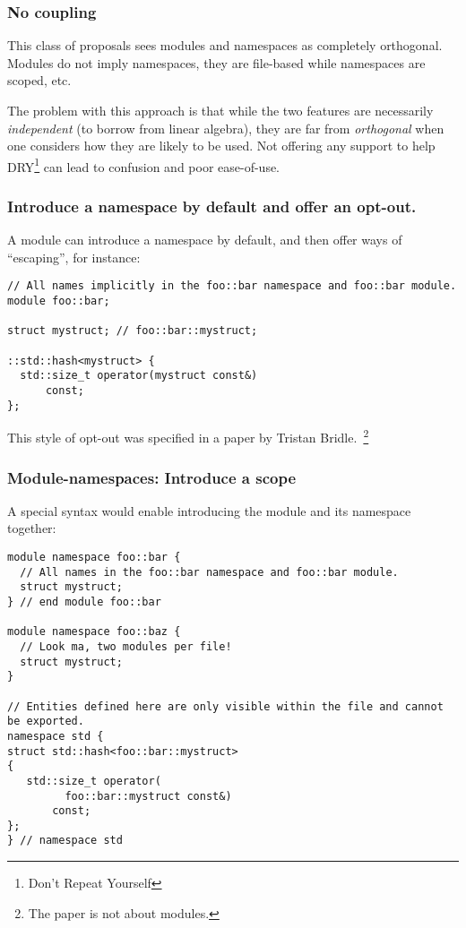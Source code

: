 \documentclass[reqno]{article}
\begin{document}
\subsubsection{No coupling}

This class of proposals sees modules and namespaces as completely orthogonal.
Modules do not imply namespaces, they are file-based while namespaces are
scoped, etc.

The problem with this approach is that while the two features are necessarily
\emph{independent} (to borrow from linear algebra), they are far from
\emph{orthogonal} when one considers how they are likely to be used. Not
offering any support to help DRY\footnote{Don't Repeat Yourself} can lead to
confusion and poor ease-of-use.


\subsubsection{Introduce a namespace by default and offer an opt-out.}

A module can introduce a namespace by default, and then offer ways of
``escaping'', for instance:

\begin{verbatim}
// All names implicitly in the foo::bar namespace and foo::bar module.
module foo::bar;

struct mystruct; // foo::bar::mystruct;

::std::hash<mystruct> {
  std::size_t operator(mystruct const&)
      const;
};
\end{verbatim}

This style of opt-out was specified in a paper by Tristan
Bridle.~\citep{P0665R0}\footnote{The paper is not about modules.}


\subsubsection{Module-namespaces: Introduce a scope}

A special syntax would enable introducing the module and its namespace together:

\begin{verbatim}
module namespace foo::bar {
  // All names in the foo::bar namespace and foo::bar module.
  struct mystruct;
} // end module foo::bar

module namespace foo::baz {
  // Look ma, two modules per file!
  struct mystruct;
}

// Entities defined here are only visible within the file and cannot be exported.
namespace std {
struct std::hash<foo::bar::mystruct>
{
   std::size_t operator(
         foo::bar::mystruct const&)
       const;
};
} // namespace std
\end{verbatim}
\end{document}
